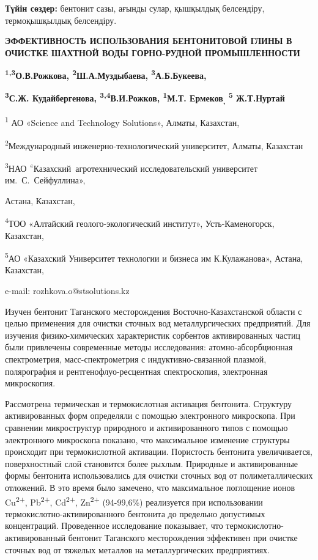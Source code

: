 {\bfseries Түйін сөздер:} бентонит сазы, ағынды сулар, қышқылдық
белсендіру, термоқышқылдық белсендіру.

{\bfseries ЭФФЕКТИВНОСТЬ ИСПОЛЬЗОВАНИЯ БЕНТОНИТОВОЙ ГЛИНЫ В ОЧИСТКЕ ШАХТНОЙ
ВОДЫ ГОРНО-РУДНОЙ ПРОМЫШЛЕННОСТИ}

{\bfseries \textsuperscript{1,3}О.В.Рожкова,
\textsuperscript{2}Ш.А.Муздыбаева, \textsuperscript{3}А.Б.Букеева,}

{\bfseries \textsuperscript{3}С.Ж. Кудайбергенова,
\textsuperscript{3,4}В.И.Рожков, \textsuperscript{1}М.Т.
Ермеков\textsubscript{,} \textsuperscript{5} Ж.Т.Нуртай}

\textsuperscript{1} АО «Science and Technology Solutions», Алматы,
Казахстан,

\textsuperscript{2}Международный инженерно-технологический университет,
Алматы, Казахстан

\textsuperscript{3}НАО \textsuperscript{«}Казахский~агротехнический
исследовательский университет им.~С.~Сейфуллина»,

Астана, Казахстан,

\textsuperscript{4}ТОО «Алтайский геолого-экологический институт»,
Усть-Каменогорск, Казахстан,

\textsuperscript{5}АО «Казахский Университет технологии и бизнеса им
К.Кулажанова», Астана, Казахстан,

e-mail: rozhkova.o@stsolutions.kz

Изучен бентонит Таганского месторождения Восточно-Казахстанской области
с целью применения для очистки сточных вод металлургических предприятий.
Для изучения физико-химических характеристик сорбентов активированных
частиц были привлечены современные методы исследования:
атомно-абсорбционная спектрометрия, масс-спектрометрия с
индуктивно-связанной плазмой, полярография и рентгенофлуо-ресцентная
спектроскопия, электронная микроскопия.

Рассмотрена термическая и термокислотная активация бентонита. Структуру
активированных форм определяли с помощью электронного микроскопа. При
сравнении микроструктур природного и активированного типов с помощью
электронного микроскопа показано, что максимальное изменение структуры
происходит при термокислотной активации. Пористость бентонита
увеличивается, поверхностный слой становится более рыхлым. Природные и
активированные формы бентонита использовались для очистки сточных вод от
полиметаллических отложений. В это время было замечено, что максимальное
поглощение ионов Cu\textsuperscript{2+}, Pb\textsuperscript{2+},
Cd\textsuperscript{2+}, Zn\textsuperscript{2+} (94-99,6\%) реализуется
при использовании термокислотно-активированного бентонита до предельно
допустимых концентраций. Проведенное исследование показывает, что
термокислотно-активированный бентонит Таганского месторождения
эффективен при очистке сточных вод от тяжелых металлов на
металлургических предприятиях.

